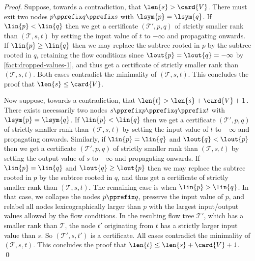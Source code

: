 \FactBranchDepthBound*
\begin{proof}
  Suppose, towards a contradiction, that $\len{s} > \card{V}$.
  There must exit two nodes $p \pprefix q \pprefix s$
  with $\lsym{p} = \lsym{q}$.
  If $\lin{p} < \lin{q}$ then we get a certificate $(\mathcal{T}', p, q)$
  of strictly smaller rank than $(\mathcal{T}, s, t)$ by setting the input value
  of $t$ to $-\infty$ and propagating onwards.
  If $\lin{p} \geq \lin{q}$ then we may replace
  the subtree rooted in $p$ by the subtree rooted in $q$,
  retaining the flow conditions since $\lout{p} = \lout{q} = -\infty$
  by \cref{fact:dropped-values-1},
  and thus get a certificate
  of strictly smaller rank than $(\mathcal{T}, s, t)$.
  Both cases contradict the minimality of $(\mathcal{T}, s, t)$.
  This concludes the proof that $\len{s} \leq \card{V}$.

  Now suppose, towards a contradiction, that $\len{t} > \len{s} + \card{V} + 1$.
  There exists necessarily two nodes $s \pprefix p \pprefix q \pprefix t$
  with $\lsym{p} = \lsym{q}$.
  If $\lin{p} < \lin{q}$ then we get a certificate $(\mathcal{T}', p, q)$
  of strictly smaller rank than $(\mathcal{T}, s, t)$ by setting the input value
  of $t$ to $-\infty$ and propagating onwards.
  Similarly,
  if $\lin{p} = \lin{q}$ and $\lout{q} < \lout{p}$
  then we get a certificate $(\mathcal{T}', p, q)$
  of strictly smaller rank than $(\mathcal{T}, s, t)$ by setting the output value
  of $s$ to $-\infty$ and propagating onwards.
  If $\lin{p} = \lin{q}$ and $\lout{q} \geq \lout{p}$ then we may replace
  the subtree rooted in $p$ by the subtree rooted in $q$,
  and thus get a certificate
  of strictly smaller rank than $(\mathcal{T}, s, t)$.
  The remaining case is when $\lin{p} > \lin{q}$.
  In that case,
  we collapse the nodes $p \pprefix q$,
  preserve the input value of $p$,
  and relabel all nodes lexicographically larger than $p$
  with the largest input/output values allowed by the flow conditions.
  In the resulting flow tree $\mathcal{T}'$,
  which has a smaller rank than $\mathcal{T}$,
  the node $t'$ originating from $t$ has a strictly larger input value than $s$.
  So $(\mathcal{T}', s, t')$ is a certificate.
  All cases contradict the minimality of $(\mathcal{T}, s, t)$.
  This concludes the proof that $\len{t} \leq \len{s} + \card{V} + 1$.
 \qed
\end{proof}

